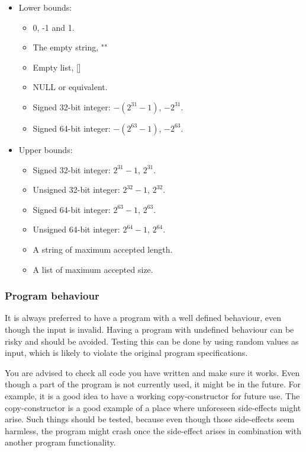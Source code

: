\documentclass[11pt,a4paper,twoside]{article}
\begin{document}
\begin{itemize}
    \item Lower bounds:
    \begin{itemize}
        \item 0, -1 and 1.
        \item The empty string, ""
        \item Empty list, []
        \item NULL or equivalent.
        \item Signed 32-bit integer: $-(2^{31}-1)$, $-2^{31}$.
        \item Signed 64-bit integer: $-(2^{63}-1)$, $-2^{63}$.
    \end{itemize}
    \item Upper bounds:
    \begin {itemize}
        \item Signed 32-bit integer: $2^{31}-1$, $2^{31}$.
        \item Unsigned 32-bit integer: $2^{32}-1$, $2^{32}$.
        \item Signed 64-bit integer: $2^{63}-1$, $2^{63}$.
        \item Unsigned 64-bit integer: $2^{64}-1$, $2^{64}$.
        \item A string of maximum accepted length.
        \item A list of maximum accepted size.
    \end{itemize}
\end{itemize}

\subsubsection{Program behaviour}

It is always preferred to have a program with a well defined behaviour, even
though the input is invalid. Having a program with undefined behaviour can be
risky and should be avoided. Testing this can be done by using random values as
input, which is likely to violate the original program specifications.

You are advised to check all code you have written and make sure it works. Even
though a part of the program is not currently used, it might be in the future.
For example, it is a good idea to have a working copy-constructor for future
use. The copy-constructor is a good example of a place where unforeseen
side-effects might arise. Such things should be tested, because even though
those side-effects seem harmless, the program might crash once the side-effect
arises in combination with another program functionality.
\end{document}
